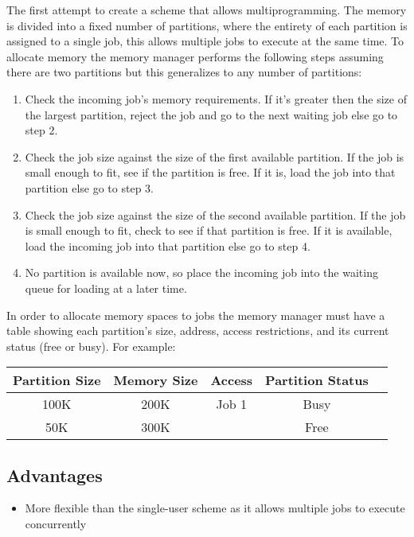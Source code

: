 \documentclass[12pt letter]{report}
\begin{document}
The first attempt to create a scheme that allows multiprogramming. The memory is divided into a fixed number of partitions, where the entirety of each partition is assigned to a single job, this allows multiple jobs to execute at the same time. To allocate memory the memory manager performs the following steps assuming there are two partitions but this generalizes to any number of partitions:
\begin{enumerate}
  \item Check the incoming job's memory requirements. If it's greater then the size of the largest partition, reject the job and go to the next waiting job else go to step 2.
  \item  Check the job size against the size of the first available partition. If the job is small enough to fit, see if the partition is free. If it is, load the job into that partition else go to step 3.
  \item Check the job size against the size of the second available partition. If the job is small enough to fit, check to see if that partition is free. If it is available, load the incoming job into that partition else go to step 4.
  \item No partition is available now, so place the incoming job into the waiting queue for loading at a later time.
\end{enumerate}

In order to allocate memory spaces to jobs the memory manager must have a table showing each partition's size, address, access restrictions, and its current status (free or busy). For example:
\begin{table}[h!]
  \begin{center}
    \begin{tabular}{|c c c c c|}
      \hline
      Partition Size & Memory Size & Access & Partition Status \\ [0.5ex]
      \hline
      \hline
      100K           & 200K        & Job 1  & Busy             \\
      50K            & 300K        &        & Free             \\
      \hline
    \end{tabular}
  \end{center}
\end{table}

\subsection{Advantages}
\begin{itemize}
  \item More flexible than the single-user scheme as it allows multiple jobs to execute concurrently
\end{itemize}
\end{document}
